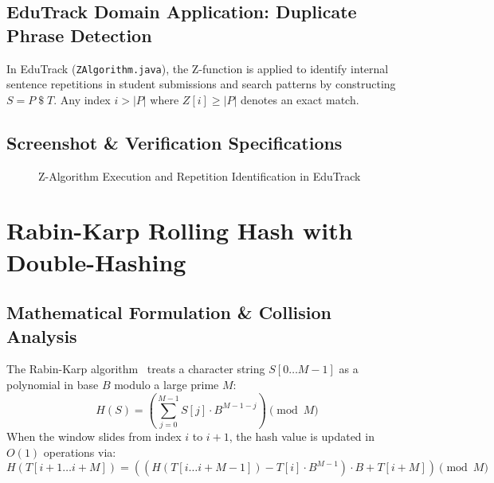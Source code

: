 \subsection{EduTrack Domain Application: Duplicate Phrase Detection}
In EduTrack (\texttt{ZAlgorithm.java}), the Z-function is applied to identify internal sentence repetitions in student submissions and search patterns by constructing $S = P \mathbin{\$} T$. Any index $i > |P|$ where $Z[i] \ge |P|$ denotes an exact match.

\subsection{Screenshot \& Verification Specifications}
\begin{figure}[H]
    \centering
    \caption{Z-Algorithm Execution and Repetition Identification in EduTrack}
    \label{fig:screenshot_z}
\end{figure}

\section{Rabin-Karp Rolling Hash with Double-Hashing}
\subsection{Mathematical Formulation \& Collision Analysis}
The Rabin-Karp algorithm~\cite{rabin1987} treats a character string $S[0 \dots M - 1]$ as a polynomial in base $B$ modulo a large prime $M$:
\begin{equation}
H(S) = \left( \sum_{j=0}^{M-1} S[j] \cdot B^{M - 1 - j} \right) \pmod M
\end{equation}
When the window slides from index $i$ to $i + 1$, the hash value is updated in $O(1)$ operations via:
\begin{equation}
H(T[i+1 \dots i+M]) = \left( \left( H(T[i \dots i+M-1]) - T[i] \cdot B^{M-1} \right) \cdot B + T[i+M] \right) \pmod M
\end{equation}

